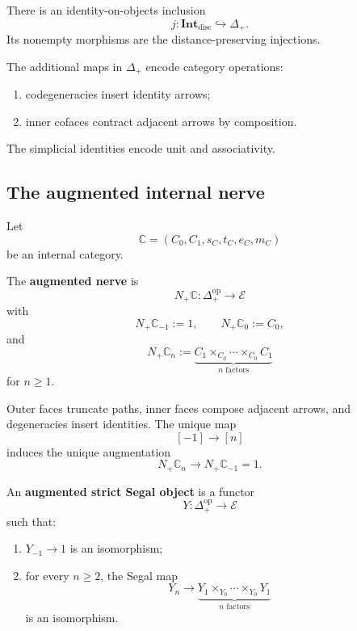 There is an identity-on-objects inclusion
\[
    j:
    \mathbf{Int}_{\mathrm{disc}}
    \hookrightarrow
    \Delta_+.
\]
Its nonempty morphisms are the distance-preserving injections.

The additional maps in \(\Delta_+\) encode category operations:
\begin{enumerate}
    \item codegeneracies insert identity arrows;
    \item inner cofaces contract adjacent arrows by composition.
\end{enumerate}
The simplicial identities encode unit and associativity.

\subsection{The augmented internal nerve}
\label{subsec:augmented-internal-nerve}

Let
\[
    \mathbb C=(C_0,C_1,s_C,t_C,e_C,m_C)
\]
be an internal category.

\begin{definition}
\label{def:augmented-internal-nerve}
The \textbf{augmented nerve} is
\[
    N_+\mathbb C:
    \Delta_+^{\mathrm{op}}
    \to
    \mathcal E
\]
with
\[
    N_+\mathbb C_{-1}:=1,
    \qquad
    N_+\mathbb C_0:=C_0,
\]
and
\[
    N_+\mathbb C_n
    :=
    \underbrace{
    C_1\times_{C_0}\cdots\times_{C_0}C_1
    }_{n\text{ factors}}
\]
for \(n\geq1\).

Outer faces truncate paths, inner faces compose adjacent arrows, and
degeneracies insert identities. The unique map
\[
    [-1]\to[n]
\]
induces the unique augmentation
\[
    N_+\mathbb C_n\to N_+\mathbb C_{-1}=1.
\]
\end{definition}

\begin{definition}
\label{def:augmented-strict-segal-object}
An \textbf{augmented strict Segal object} is a functor
\[
    Y:\Delta_+^{\mathrm{op}}\to\mathcal E
\]
such that:
\begin{enumerate}
    \item \(Y_{-1}\to1\) is an isomorphism;
    \item for every \(n\geq2\), the Segal map
    \[
        Y_n
        \longrightarrow
        \underbrace{
        Y_1\times_{Y_0}\cdots\times_{Y_0}Y_1
        }_{n\text{ factors}}
    \]
    is an isomorphism.
\end{enumerate}
\end{definition}

